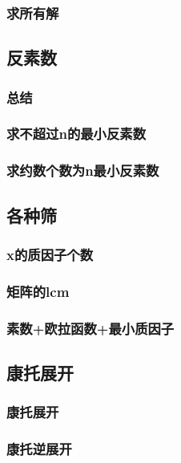 \documentclass[10pt,a4paper]{article}
\begin{document}
\subsubsection{求所有解}

\subsection{反素数}
\subsubsection{总结}

\subsubsection{求不超过n的最小反素数}

\subsubsection{求约数个数为n最小反素数}

\subsection{各种筛}
\subsubsection{x的质因子个数}

\subsubsection{矩阵的lcm}

\subsubsection{素数+欧拉函数+最小质因子}

\subsection{康托展开}
\subsubsection{康托展开}

\subsubsection{康托逆展开}

\end{document}

